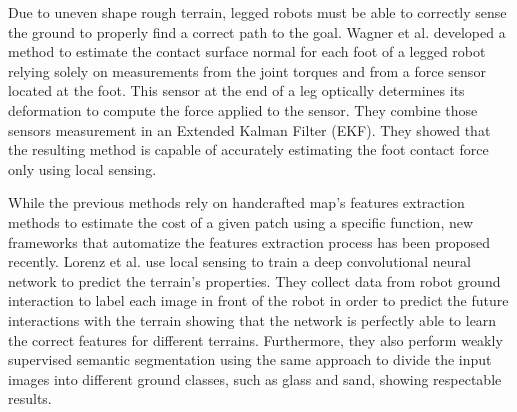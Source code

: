\documentclass[../document.tex]{subfiles}
\begin{document}
Due to uneven shape rough terrain, legged robots must be able to correctly sense the ground to properly find a correct path to the goal. Wagner et al. \cite{wagner2016foot} developed a method to estimate the contact surface normal for each foot of a legged robot relying solely on measurements from the joint torques and from a force sensor located at the foot. This sensor at the end of a leg optically determines its deformation to compute the force applied to the sensor. They combine those sensors measurement in an Extended Kalman Filter (EKF). They showed that the resulting method is capable of accurately estimating the foot contact force only using local sensing.

While the previous methods rely on handcrafted map's features extraction methods to estimate the cost of a given patch using a specific function, new frameworks that automatize the features extraction process has been proposed recently. Lorenz et al. \cite{wellhausen2019where} use local sensing to train a deep convolutional neural network to predict the terrain's properties. They collect data from robot ground interaction to label each image in front of the robot in order to predict the future interactions with the terrain showing that the network is perfectly able to learn the correct features for different terrains.
Furthermore, they also perform weakly supervised semantic segmentation using the same approach to divide the input images into different ground classes, such as glass and sand, showing respectable results.
\end{document}
